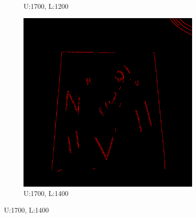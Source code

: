 \documentclass[11pt]{article}
\begin{document}
\begin{figure}[!h]
\begin{subfigure}[t]{.25\textwidth}
		\caption{U:1700, L:1200}
	\end{subfigure}
\hfill
	\begin{subfigure}[t]{.25\textwidth}
		\centering
		\includegraphics[scale=0.3]{pics/normalThreshTest/Upper1700lower1400kernel5.png}
		\caption{U:1700, L:1400}	
	\end{subfigure}



\end{figure}
\end{document}
